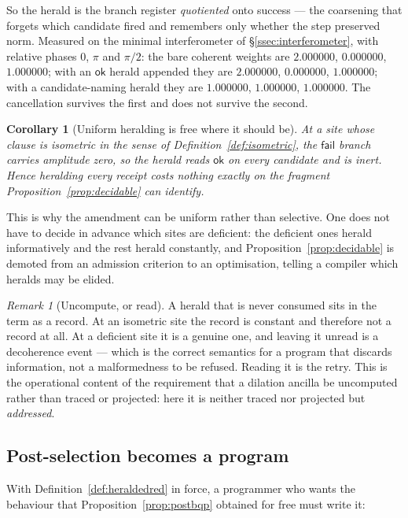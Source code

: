 \documentclass[11pt,a4paper]{article}
\theoremstyle{plain}
\newtheorem{corollary}[theorem]{Corollary}
\theoremstyle{definition}
\theoremstyle{remark}
\newtheorem{remark}[theorem]{Remark}
\begin{document}
So the herald is the branch register \emph{quotiented} onto success --- the
coarsening that forgets which candidate fired and remembers only whether the
step preserved norm. Measured on the minimal interferometer of
\S\ref{ssec:interferometer}, with relative phases $0$, $\pi$ and $\pi/2$: the
bare coherent weights are $2.000000$, $0.000000$, $1.000000$; with an
$\mathsf{ok}$ herald appended they are $2.000000$, $0.000000$, $1.000000$; with
a candidate-naming herald they are $1.000000$, $1.000000$, $1.000000$. The
cancellation survives the first and does not survive the second.

\begin{corollary}[Uniform heralding is free where it should be]\label{cor:inert}
At a site whose clause is isometric in the sense of
Definition~\ref{def:isometric}, the $\mathsf{fail}$ branch carries amplitude
zero, so the herald reads $\mathsf{ok}$ on every candidate and is inert. Hence
heralding every receipt costs nothing exactly on the fragment
Proposition~\ref{prop:decidable} can identify.
\end{corollary}

This is why the amendment can be uniform rather than selective. One does not have
to decide in advance which sites are deficient: the deficient ones herald
informatively and the rest herald constantly, and Proposition~\ref{prop:decidable}
is demoted from an admission criterion to an optimisation, telling a compiler
which heralds may be elided.

\begin{remark}[Uncompute, or read]\label{rem:uncompute}
A herald that is never consumed sits in the term as a record. At an isometric
site the record is constant and therefore not a record at all. At a deficient
site it is a genuine one, and leaving it unread is a decoherence event --- which
is the correct semantics for a program that discards information, not a
malformedness to be refused. Reading it is the retry. This is the operational
content of the requirement that a dilation ancilla be uncomputed rather than
traced or projected: here it is neither traced nor projected but
\emph{addressed}.
\end{remark}

\subsection{Post-selection becomes a program}\label{ssec:rus}

With Definition~\ref{def:heraldedred} in force, a programmer who wants the
behaviour that Proposition~\ref{prop:postbqp} obtained for free must write it:
\end{document}
